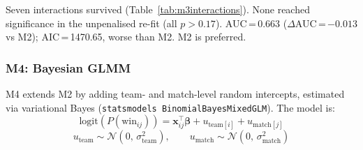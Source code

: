 \documentclass[12pt,a4paper]{article}
\begin{document}
Seven interactions survived (Table~\ref{tab:m3interactions}). None reached significance in
the unpenalised re-fit (all $p > 0.17$). AUC\,=\,0.663 ($\Delta$AUC\,=\,$-0.013$ vs M2);
AIC\,=\,1470.65, worse than M2. M2 is preferred.

\begin{table}[H]
\centering
\caption{M3: Interactions surviving LASSO ($C = 0.05$), re-fitted without penalisation.}
\label{tab:m3interactions}
\end{table}

\subsubsection{M4: Bayesian GLMM}

M4 extends M2 by adding team- and match-level random intercepts, estimated via variational
Bayes (\texttt{statsmodels BinomialBayesMixedGLM}). The model is:
\[
  \text{logit}\!\left(P(\text{win}_{ij})\right)
    = \mathbf{x}_{ij}^\top \boldsymbol{\beta}
    + u_{\text{team}[i]}
    + u_{\text{match}[j]}
\]
\[
  u_{\text{team}} \sim \mathcal{N}(0,\,\sigma^2_{\text{team}}), \qquad
  u_{\text{match}} \sim \mathcal{N}(0,\,\sigma^2_{\text{match}})
\]
\end{document}
